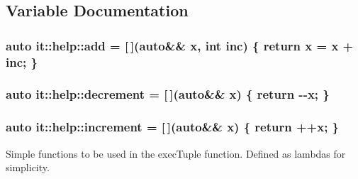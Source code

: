 \subsection{Variable Documentation}
\subsubsection[{\texorpdfstring{add}{add}}]{\setlength{\rightskip}{0pt plus 5cm}auto it\+::help\+::add = \mbox{[}$\,$\mbox{]}(auto\&\& x, int inc) \{ return x = x + inc; \}}\hypertarget{namespaceit_1_1help_af07b5865ce1568f58510ad90edb12466}{}\label{namespaceit_1_1help_af07b5865ce1568f58510ad90edb12466}
\subsubsection[{\texorpdfstring{decrement}{decrement}}]{\setlength{\rightskip}{0pt plus 5cm}auto it\+::help\+::decrement = \mbox{[}$\,$\mbox{]}(auto\&\& x) \{ return -\/-\/x; \}}\hypertarget{namespaceit_1_1help_aede42ee87c964f50151e495144d1085b}{}\label{namespaceit_1_1help_aede42ee87c964f50151e495144d1085b}
\subsubsection[{\texorpdfstring{increment}{increment}}]{\setlength{\rightskip}{0pt plus 5cm}auto it\+::help\+::increment = \mbox{[}$\,$\mbox{]}(auto\&\& x) \{ return ++x; \}}\hypertarget{namespaceit_1_1help_a47a31a8a4344c62bfbc0f7686d6160e1}{}\label{namespaceit_1_1help_a47a31a8a4344c62bfbc0f7686d6160e1}


Simple functions to be used in the \textquotesingle{}exec\+Tuple\textquotesingle{} function. Defined as lambdas for simplicity. 

